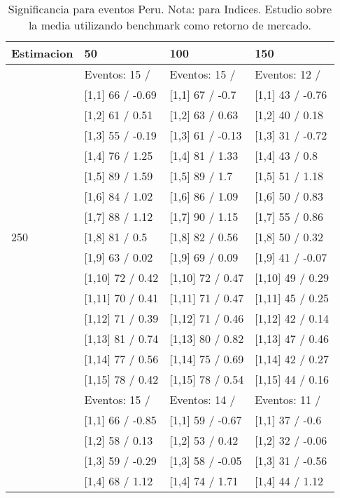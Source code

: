 \begin{table}

\caption{Significancia para eventos Peru. Nota: para Indices. Estudio sobre la media utilizando benchmark como retorno de mercado.}
\centering
\begin{tabular}[t]{llll}
\toprule
Estimacion & 50 & 100 & 150\\
\midrule
 & Eventos:  15 / & Eventos:  15 / & Eventos:  12 /\\
 & {}[1,1] 66  / -0.69 & {}[1,1] 67  / -0.7 & {}[1,1] 43  / -0.76\\
 & {}[1,2] 61  / 0.51 & {}[1,2] 63  / 0.63 & {}[1,2] 40  / 0.18\\
 & {}[1,3] 55  / -0.19 & {}[1,3] 61  / -0.13 & {}[1,3] 31  / -0.72\\
 & {}[1,4] 76  / 1.25 & {}[1,4] 81  / 1.33 & {}[1,4] 43  / 0.8\\
\addlinespace
 & {}[1,5] 89  / 1.59 & {}[1,5] 89  / 1.7 & {}[1,5] 51  / 1.18\\
 & {}[1,6] 84  / 1.02 & {}[1,6] 86  / 1.09 & {}[1,6] 50  / 0.83\\
 & {}[1,7] 88  / 1.12 & {}[1,7] 90  / 1.15 & {}[1,7] 55  / 0.86\\
250 & {}[1,8] 81  / 0.5 & {}[1,8] 82  / 0.56 & {}[1,8] 50  / 0.32\\
 & {}[1,9] 63  / 0.02 & {}[1,9] 69  / 0.09 & {}[1,9] 41  / -0.07\\
\addlinespace
 & {}[1,10] 72  / 0.42 & {}[1,10] 72  / 0.47 & {}[1,10] 49  / 0.29\\
 & {}[1,11] 70  / 0.41 & {}[1,11] 71  / 0.47 & {}[1,11] 45  / 0.25\\
 & {}[1,12] 71  / 0.39 & {}[1,12] 71  / 0.46 & {}[1,12] 42  / 0.14\\
 & {}[1,13] 81  / 0.74 & {}[1,13] 80  / 0.82 & {}[1,13] 47  / 0.46\\
 & {}[1,14] 77  / 0.56 & {}[1,14] 75  / 0.69 & {}[1,14] 42  / 0.27\\
\addlinespace
 & {}[1,15] 78  / 0.42 & {}[1,15] 78  / 0.54 & {}[1,15] 44  / 0.16\\
 & Eventos:  15 / & Eventos:  14 / & Eventos:  11 /\\
 & {}[1,1] 66  / -0.85 & {}[1,1] 59  / -0.67 & {}[1,1] 37  / -0.6\\
 & {}[1,2] 58  / 0.13 & {}[1,2] 53  / 0.42 & {}[1,2] 32  / -0.06\\
 & {}[1,3] 59  / -0.29 & {}[1,3] 58  / -0.05 & {}[1,3] 31  / -0.56\\
\addlinespace
 & {}[1,4] 68  / 1.12 & {}[1,4] 74  / 1.71 & {}[1,4] 44  / 1.12\\

\end{tabular}
\end{table}
